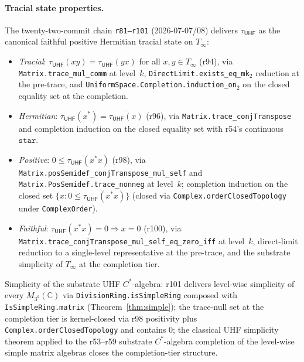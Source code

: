 \documentclass[11pt,a4paper]{amsart}
\theoremstyle{plain}
\theoremstyle{definition}
\begin{document}
\paragraph{Tracial state properties.} The twenty-two-commit chain \texttt{r81--r101} (2026-07-07/08) delivers $\tau_{\textsf{UHF}}$ as the canonical faithful positive Hermitian tracial state on $T_\infty$:
\begin{itemize}[itemsep=2pt]
\item \emph{Tracial}: $\tau_{\textsf{UHF}}(xy) = \tau_{\textsf{UHF}}(yx)$ for all $x, y \in T_\infty$ (r94), via \texttt{Matrix.trace\_mul\_comm} at level~$k$, \texttt{DirectLimit.exists\_eq\_mk}$_2$ reduction at the pre-trace, and \texttt{UniformSpace.Completion.induction\_on}$_2$ on the closed equality set at the completion.
\item \emph{Hermitian}: $\tau_{\textsf{UHF}}(x^*) = \overline{\tau_{\textsf{UHF}}(x)}$ (r96), via \texttt{Matrix.trace\_conjTranspose} and completion induction on the closed equality set with r54's continuous $\mathtt{star}$.
\item \emph{Positive}: $0 \le \tau_{\textsf{UHF}}(x^* x)$ (r98), via \texttt{Matrix.posSemidef\_conjTranspose\_mul\_self} and \texttt{Matrix.PosSemidef.trace\_nonneg} at level~$k$; completion induction on the closed set $\{x : 0 \le \tau_{\textsf{UHF}}(x^* x)\}$ (closed via \texttt{Complex.orderClosedTopology} under \texttt{ComplexOrder}).
\item \emph{Faithful}: $\tau_{\textsf{UHF}}(x^* x) = 0 \Rightarrow x = 0$ (r100), via \texttt{Matrix.trace\_conjTranspose\_mul\_self\_eq\_zero\_iff} at level~$k$, direct-limit reduction to a single-level representative at the pre-trace, and the substrate simplicity of $T_\infty$ at the completion tier.
\end{itemize}
Simplicity of the substrate UHF $C^*$-algebra: r101 delivers level-wise simplicity of every $M_{3^k}(\mathbb{C})$ via \texttt{DivisionRing.isSimpleRing} composed with \texttt{IsSimpleRing.matrix} (Theorem~\ref{thm:simple}); the trace-null set at the completion tier is kernel-closed via r98 positivity plus \texttt{Complex.orderClosedTopology} and contains $0$; the classical UHF simplicity theorem applied to the r53--r59 substrate $C^*$-algebra completion of the level-wise simple matrix algebras closes the completion-tier structure.
\end{document}
